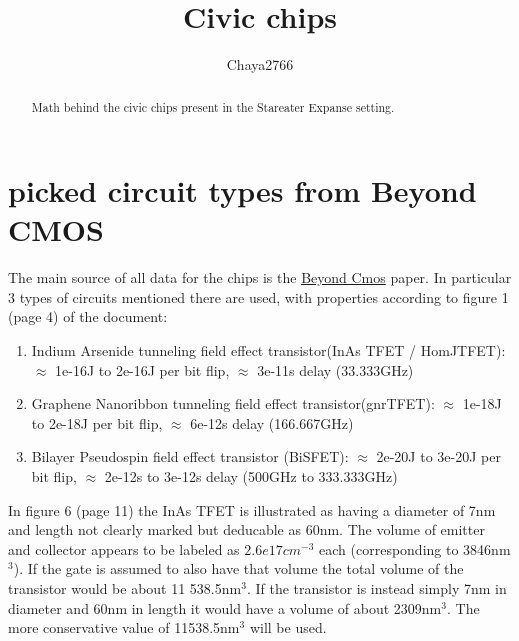 \documentclass[a4paper]{article}
\title{Civic chips}
\author{Chaya2766}
\begin{document}
	\sffamily
	\sloppy
	
	\maketitle
	
	\vfill
	
	\begin{abstract}
		Math behind the civic chips present in the Stareater Expanse setting.
	\end{abstract}
	
	\vfill
	
	\tableofcontents
	
	\pagebreak
	
	\section{picked circuit types from Beyond CMOS}
	
	The main source of all data for the chips is the \href{https://arxiv.org/abs/1302.0244}{Beyond Cmos} paper. In particular 3 types of circuits mentioned there are used, with properties according to figure 1 (page 4) of the document:
	
	\begin{enumerate}
		\item Indium Arsenide tunneling field effect transistor(InAs TFET / HomJTFET): $\approx$ 1e-16J to 2e-16J per bit flip, $\approx$ 3e-11s delay (33.333GHz)
		
		\item Graphene Nanoribbon tunneling field effect transistor(gnrTFET): $\approx$ 1e-18J to 2e-18J per bit flip, $\approx$ 6e-12s delay (166.667GHz)
		
		\item Bilayer Pseudospin field effect transistor (BiSFET): $\approx$ 2e-20J to 3e-20J per bit flip, $\approx$ 2e-12s to 3e-12s delay (500GHz to 333.333GHz)
	\end{enumerate}
	
	In figure 6 (page 11) the InAs TFET is illustrated as having a diameter of 7nm and length not clearly marked but deducable as 60nm. The volume of emitter and collector appears to be labeled as $2.6e17cm^{-3}$ each (corresponding to 3846nm$^3$). If the gate is assumed to also have that volume the total volume of the transistor would be about 11 538.5nm$^3$. If the transistor is instead simply 7nm in diameter and 60nm in length it would have a volume of about 2309nm$^3$. The more conservative value of 11538.5nm$^3$ will be used.
	
\end{document}
